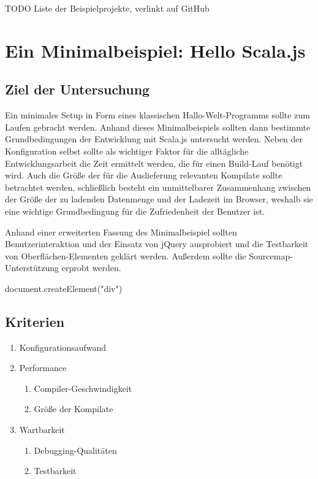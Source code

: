 \documentclass[a4paper, 12pt, hidelinks, listof=totoc, listoftables=totoc, bibliography=totoc]{scrreprt}
\begin{document}
TODO Liste der Beispielprojekte, verlinkt auf GitHub


\section{Ein Minimalbeispiel: Hello Scala.js}


\subsection{Ziel der Untersuchung}

Ein minimales Setup in Form eines klassischen Hallo-Welt-Programms sollte zum Laufen gebracht werden. Anhand dieses Minimalbeispiels sollten dann bestimmte Grundbedingungen der Entwicklung mit Scala.js untersucht werden. Neben der Konfiguration selbst sollte als wichtiger Faktor für die alltägliche Entwicklungsarbeit die Zeit ermittelt werden, die für einen Build-Lauf benötigt wird. Auch die Größe der für die Auslieferung relevanten Kompilate sollte betrachtet werden, schließlich besteht ein unmittelbarer Zusammenhang zwischen der Größe der zu ladenden Datenmenge und der Ladezeit im Browser, weshalb sie eine wichtige Grundbedingung für die Zufriedenheit der Benutzer ist.

Anhand einer erweiterten Fassung des Minimalbeispiel sollten Benutzerinteraktion und der Einsatz von jQuery ausprobiert und die Testbarkeit von Oberflächen-Elementen geklärt werden. Außerdem sollte die Sourcemap-Unterstützung erprobt werden.

document.createElement("div")
\subsection{Kriterien}

\begin{enumerate}
	\item Konfigurationsaufwand
	\item Performance
	\begin{enumerate}
		\item Compiler-Geschwindigkeit
		\item Größe der Kompilate
	\end{enumerate}
	\item Wartbarkeit
		\begin{enumerate}
			\item Debugging-Qualitäten
			\item Testbarkeit
		\end{enumerate}
\end{enumerate}
\end{document}
